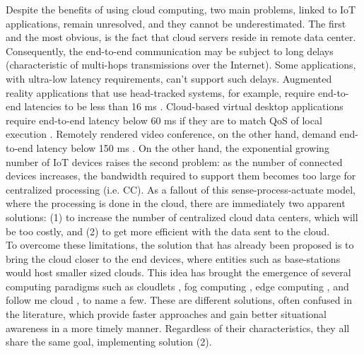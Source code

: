 Despite the benefits of using cloud computing, two main problems, linked to IoT applications, remain unresolved, and they cannot be underestimated. The first and the most obvious, is the fact that cloud servers reside in remote data center. Consequently, the end-to-end communication may be subject to long delays (characteristic of multi-hops transmissions over the Internet). Some applications, with ultra-low latency requirements, can't support such delays. Augmented reality applications that use head-tracked systems, for example, require end-to-end latencies to be less than 16 ms \cite{ellis2004generalizeability}. Cloud-based virtual desktop applications require end-to-end latency below 60 ms if they are to match QoS of local execution \cite{taylor2015virtual}. Remotely rendered video conference, on the other hand, demand end-to-end latency below 150 ms \cite{szigeti2005end}. On the other hand, the exponential growing number of IoT devices raises the second problem: as the number of connected devices increases, the bandwidth required to support them becomes too large for centralized processing (i.e. CC). As a fallout of this sense-process-actuate model, where the processing is done in the cloud, there are immediately two apparent solutions: (1) to increase the number of centralized cloud data centers, which will be too costly, and (2) to get more efficient with the data sent to the cloud.\\ [6pt]
To overcome these limitations, the solution that has already been proposed is to bring the cloud closer to the end devices, where entities such as base-stations would host smaller sized clouds. This idea has brought the emergence of several computing paradigms such as cloudlets \cite{satyanarayanan2013cloudlets}, fog computing \cite{bonomi2012fog}, edge computing \cite{davy2014challenges}, and follow me cloud \cite{taleb2013follow}, to name a few. These are different solutions, often confused in the literature, which provide faster approaches and gain better situational awareness in a more timely manner. Regardless of their characteristics, they all share the same goal, implementing solution (2).\\ [6pt]

